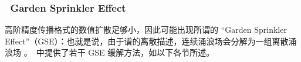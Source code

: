 \vsssub
\subsubsection{~Garden Sprinkler Effect} \label{sub:num_GSE}
\vsssub

\noindent
高阶精度传播格式的数值扩散足够小，因此可能出现所谓的 “Garden Sprinkler Effect”（GSE）：也就是说，由于谱的离散描述，连续涌浪场会分解为一组离散涌浪场 \citep[图~3c]{art:BH87}。\ws\ 中提供了若干 GSE 缓解方法，如以下各节所述。
